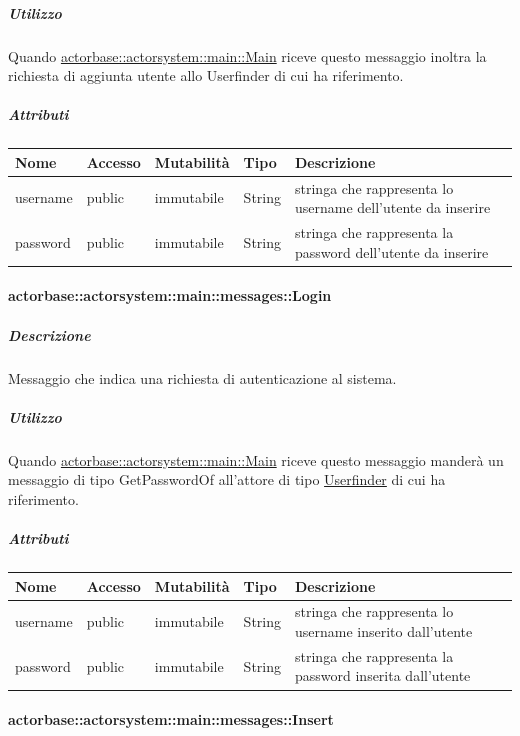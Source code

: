 \documentclass{scalatekids-article}
\begin{document}
\subparagraph{Utilizzo}
Quando \hyperref[sec:actorbase::actorsystem::main::Main]{actorbase::actorsystem::main::Main}
riceve questo messaggio inoltra la richiesta di aggiunta utente allo
Userfinder di cui ha riferimento.

\subparagraph{Attributi}
\begin{tabular}{| p{3cm} | p{1.5cm} | p{2cm} | p{2cm} | p{8.5cm} |}
  \hline
  Nome & Accesso & Mutabilità & Tipo & Descrizione\\
  \hline
  username & public & immutabile & String & stringa che rappresenta lo username dell'utente da inserire \\
  \hline
  password & public & immutabile & String & stringa che rappresenta la password dell'utente da inserire \\
  \hline
\end{tabular}

\paragraph{actorbase::actorsystem::main::messages::Login}
\label{sec:actorbase::actorsystem::main::messages::Login}

\subparagraph{Descrizione}
Messaggio che indica una richiesta di autenticazione al sistema.

\subparagraph{Utilizzo}
Quando \hyperref[sec:actorbase::actorsystem::main::Main]{actorbase::actorsystem::main::Main}
riceve questo messaggio manderà un messaggio di tipo GetPasswordOf
all'attore di tipo \hyperref[sec:actorbase::actorsystem::userfinder::Userfinder]{Userfinder} di cui ha riferimento.

\subparagraph{Attributi}
\begin{tabular}{| p{3cm} | p{1.5cm} | p{2cm} | p{2cm} | p{8.5cm} |}
  \hline
  Nome & Accesso & Mutabilità & Tipo & Descrizione\\
  \hline
  username & public & immutabile & String & stringa che rappresenta lo username inserito dall'utente \\
  \hline
  password & public & immutabile & String & stringa che rappresenta la password inserita dall'utente \\
  \hline
\end{tabular}

\paragraph{actorbase::actorsystem::main::messages::Insert}
\label{sec:actorbase::actorsystem::main::messages::Insert}
\end{document}
